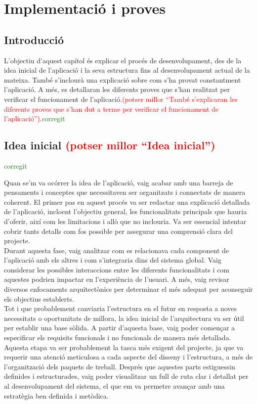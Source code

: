 \documentclass[a4paper,12pt,twoside]{ThesisStyle}
\newcommand{\pau}[1]{\textcolor{red}{#1}}
\newcommand{\sudan}[1]{\textcolor{green}{#1}}
\begin{document}
\chapter{Implementació i proves}
\label{chp:implementacio}


\section{Introducció}
\label{sec: Introducció}

L'objectiu d'aquest capítol és explicar el procés de desenvolupament, des de la idea inicial de l'aplicació i la seva estructura fins al desenvolupament actual de la mateixa. També s'inclourà una explicació sobre com s'ha provat constantment l'aplicació. A més, es detallaran les diferents proves que s’han realitzat per verificar el funcionament de l’aplicació.\pau{(potser millor ``També s'explicaran les diferents proves que s'han dut a terme per verificar el funcionament de l'aplicació'')}.\sudan{corregit}


\section{Idea inicial \pau{(potser millor ``Idea inicial'')}}\sudan{corregit}
\label{sec: Organitza la idea}

Quan se'm va ocórrer la idea de l'aplicació, vaig acabar amb una barreja de pensaments i conceptes que necessitaven ser organitzats i connectats de manera coherent. El primer pas en aquest procés va ser redactar una explicació detallada de l'aplicació, incloent l'objectiu general, les funcionalitats principals que hauria d'oferir, així com les limitacions i allò que no inclouria. Va ser essencial intentar cobrir tants detalls com fos possible per assegurar una comprensió clara del projecte.\\

Durant aquesta fase, vaig analitzar com es relacionava cada component de l'aplicació amb els altres i com s'integraria dins del sistema global. Vaig considerar les possibles interaccions entre les diferents funcionalitats i com aquestes podrien impactar en l'experiència de l'usuari. A més, vaig revisar diversos enfocaments arquitectònics per determinar el més adequat per aconseguir els objectius establerts.\\

Tot i que probablement canviaria l'estructura en el futur en resposta a noves necessitats o oportunitats de millora, la idea inicial de l'arquitectura va ser útil per establir una base sòlida. A partir d'aquesta base, vaig poder començar a especificar els requisits funcionals i no funcionals de manera més detallada. Aquesta etapa va ser probablement la tasca més exigent del projecte, ja que va requerir una atenció meticulosa a cada aspecte del disseny i l'estructura, a més de l'organització dels paquets de treball. Després que aquestes parts estiguessin definides i estructurades, vaig poder visualitzar un full de ruta clar i detallat per al desenvolupament del sistema, el que em va permetre avançar amb una estratègia ben definida i metòdica.
\end{document}
